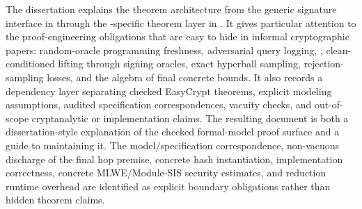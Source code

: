 The dissertation explains the theorem architecture from the generic signature
\rom{} interface in  through the \haetae{}-specific theorem
layer in .  It gives particular attention to the
proof-engineering obligations that are easy to hide in informal cryptographic
papers: random-oracle programming freshness, adversarial query logging,
, clean-conditioned lifting through signing
oracles, exact hyperball sampling, rejection-sampling losses, and the algebra of
final concrete bounds.  It also records a dependency layer separating checked
EasyCrypt theorems, explicit modeling assumptions, audited specification
correspondences, vacuity checks, and out-of-scope cryptanalytic or
implementation claims.  The resulting document is both a dissertation-style
explanation of the checked formal-model proof surface and a guide to maintaining
it.  The model/specification correspondence, non-vacuous discharge of the final
hop premise, concrete hash instantiation, implementation correctness, concrete
MLWE/Module-SIS security estimates, and reduction runtime overhead are
identified as explicit boundary obligations rather than hidden theorem claims.

\cleardoublepage
